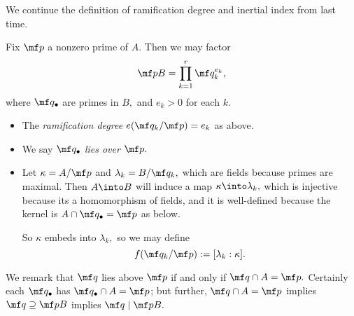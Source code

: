 We continue the definition of ramification degree and inertial index from last time.
\begin{defi} \label{def:raminert}
	Fix $\mf p$ a nonzero prime of $A.$ Then we may factor
	\[\mf pB=\prod_{k=1}^r\mf q_k^{e_k},\]
	where $\mf q_\bullet$ are primes in $B,$ and $e_k>0$ for each $k.$
	\begin{itemize}
		\item The \textit{ramification degree}  $e(\mf q_k/\mf p)=e_k$ as above.
		\item We say $\mf q_\bullet$ \textit{lies over} $\mf p.$
		\item Let $\kappa=A/\mf p$ and $\lambda_k=B/\mf q_k,$ which are fields because primes are maximal. Then $A\into B$ will induce a map $\kappa\into\lambda_k,$ which is injective because its a homomorphism of fields, and it is well-defined because the kernel is $A\cap\mf q_\bullet=\mf p$ as below.
		
		So $\kappa$ embeds into $\lambda_k,$ so we may define
		\[f(\mf q_k/\mf p):=[\lambda_k:\kappa].\]
	\end{itemize}
\end{defi}
We remark that $\mf q$ lies above $\mf p$ if and only if $\mf q\cap A=\mf p.$ Certainly each $\mf q_\bullet$ has $\mf q_\bullet\cap A=\mf p$\todo{}; but further, $\mf q\cap A=\mf p$ implies $\mf q\supseteq\mf pB$ implies $\mf q\mid\mf pB.$

